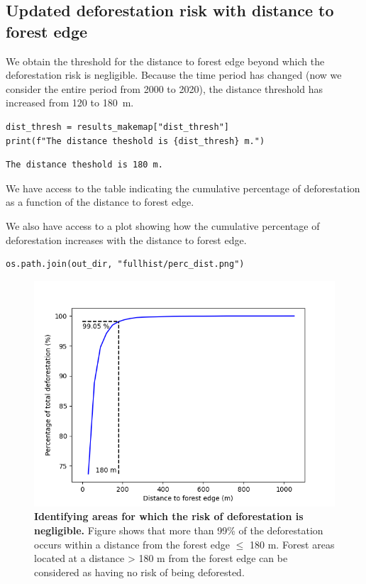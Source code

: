 \documentclass[paper=a4, 12pt, DIV=12]{scrartcl}
\begin{document}
\subsection{Updated deforestation risk with distance to forest edge}
\label{sec:org20ed25e}

We obtain the threshold for the distance to forest edge beyond which the deforestation risk is negligible. Because the time period has changed (now we consider the entire period from 2000 to 2020), the distance threshold has increased from 120 to 180 m.

\begin{verbatim}
dist_thresh = results_makemap["dist_thresh"]
print(f"The distance theshold is {dist_thresh} m.")
\end{verbatim}

\begin{verbatim}
The distance theshold is 180 m.
\end{verbatim}


We have access to the table indicating the cumulative percentage of deforestation as a function of the distance to forest edge.

We also have access to a plot showing how the cumulative percentage of deforestation increases with the distance to forest edge.

\begin{verbatim}
os.path.join(out_dir, "fullhist/perc_dist.png")
\end{verbatim}

\begin{figure}[H]
\centering
\includegraphics[width=0.8\linewidth]{outputs/fullhist/perc_dist.png}
\caption{\label{fig:orga7ee0ad}\textbf{Identifying areas for which the risk of deforestation is negligible.} Figure shows that more than 99\% of the deforestation occurs within a distance from the forest edge \(\leq\) 180 m. Forest areas located at a distance > 180 m from the forest edge can be considered as having no risk of being deforested.}
\end{figure}
\end{document}
